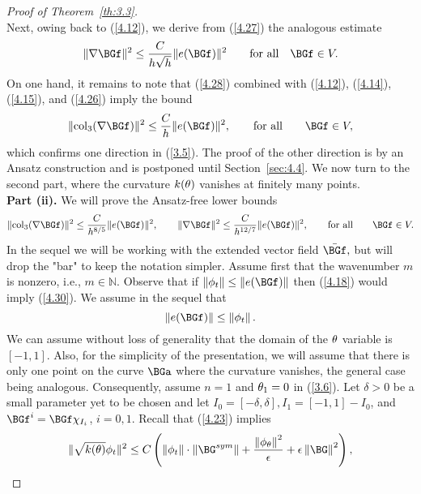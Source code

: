 \begin{proof}[Proof of Theorem~{\ref{th:3.3}}]
\begin{equation}
\end{equation}
Next, owing back to (\ref{4.12}), we derive from (\ref{4.27}) the analogous estimate 
\begin{equation}
\label{4.28}
\|\nabla\BGf\|^2\leq \frac{C}{h\sqrt{h}}\|e(\BGf)\|^2 \qquad\text{for all}\quad \BGf\in V.
\end{equation}
On one hand, it remains to note that (\ref{4.28}) combined with (\ref{4.12}), (\ref{4.14}), (\ref{4.15}), and (\ref{4.26}) imply the bound 
\begin{equation}
\label{4.29}
\|\mathrm{col}_3(\nabla\BGf)\|^2\leq\frac{C}{h}\|e(\BGf)\|^2,\qquad\text{for all}\qquad \BGf\in V,
\end{equation}
which confirms one direction in (\ref{3.5}). The proof of the other direction is by an Ansatz construction and is postponed until Section~\ref{sec:4.4}. We now turn to the second part, where the curvature $k(\theta)$ vanishes at finitely many points.\\
\textbf{Part (ii). } We will prove the Ansatz-free lower bounds
\begin{equation}
\label{4.30}
\|\mathrm{col}_3(\nabla\BGf)\|^2\leq\frac{C}{h^{8/5}}\|e(\BGf)\|^2,\qquad\|\nabla\BGf\|^2\leq\frac{C}{h^{12/7}}\|e(\BGf)\|^2,\qquad\text{for all}\qquad \BGf\in V.
\end{equation}
In the sequel we will be working with the extended vector field $\bar\BGf,$ but will drop the "bar" to keep the notation simpler. Assume first that the wavenumber $m$ is nonzero, i.e., $m\in\mathbb N.$ Observe that if $\norm{\phi_t}\leq \norm{e(\BGf)}$ then (\ref{4.18}) would imply (\ref{4.30}). We assume in the sequel that 
 \begin{equation}
 \label{4.31}
 \norm{e(\BGf)}\leq\norm{\phi_t}.
\end{equation}
We can assume without loss of generality that the domain of the $\theta$ variable is $[-1,1].$ Also, for the simplicity of the presentation, we will assume that there is only one point on the curve $\BGa$ where the curvature vanishes, the general case being analogous. Consequently, assume $n=1$ and $\theta_1=0$ in (\ref{3.6}). 
Let $\delta>0$ be a small parameter yet to be chosen and let $I_0= [-\delta,\delta], I_1=[-1,1]-I_0$, and $\BGf^i=\BGf\chi_{I_i}$, $i=0,1.$ 
Recall that (\ref{4.23}) implies 
\begin{equation}
\label{4.32}
\|\sqrt{k(\theta)}\phi_t\|^2\leq C\left( \norm{\phi_t}\cdot \norm{\BG^{sym}}+ \frac{\norm{\phi_\theta}^2}{\epsilon}+\epsilon\norm{\BG}^2\right),
\end{equation}

\end{proof}
